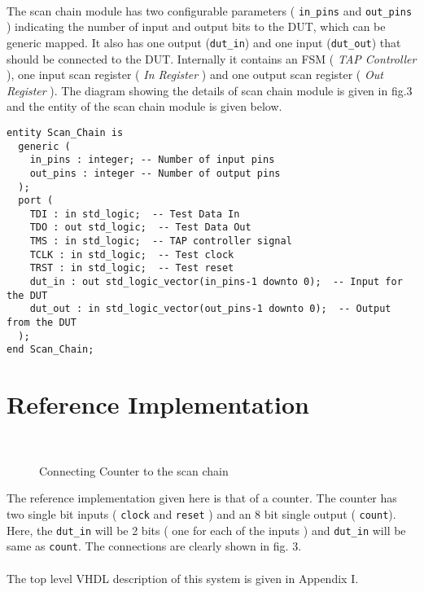 \documentclass[a4paper,11pt]{article}
\begin{document}
\paragraph*{}

The scan chain module has two configurable parameters ( \texttt{in\_pins} and \texttt{out\_pins} ) indicating the number of input and output bits to the DUT, which can be generic mapped. It also has one output (\texttt{dut\_in}) and one input (\texttt{dut\_out}) that should be connected to the DUT. Internally it contains an FSM ( \textit{TAP Controller} ), one input scan register ( \textit{In Register} ) and one output scan register ( \textit{Out Register} ). The diagram showing the details of scan chain module is given in fig.3 and the entity of the scan chain module is given below.

\begin{verbatim}
entity Scan_Chain is
  generic (
    in_pins : integer; -- Number of input pins
    out_pins : integer -- Number of output pins
  );
  port (
    TDI : in std_logic;  -- Test Data In
    TDO : out std_logic;  -- Test Data Out
    TMS : in std_logic;  -- TAP controller signal
    TCLK : in std_logic;  -- Test clock
    TRST : in std_logic;  -- Test reset
    dut_in : out std_logic_vector(in_pins-1 downto 0);  -- Input for the DUT
    dut_out : in std_logic_vector(out_pins-1 downto 0);  -- Output from the DUT
  );
end Scan_Chain;
\end{verbatim}

\section{Reference Implementation}

\begin{figure}[h!]
\centering
\\
\caption{Connecting Counter to the scan chain}
\end{figure}

The reference implementation given here is that of a counter. The counter has two single bit inputs ( \texttt{clock} and \texttt{reset} ) and an 8 bit single output ( \texttt{count}). Here, the \texttt{dut\_in} will be 2 bits ( one for each of the inputs ) and \texttt{dut\_in} will be same as \texttt{count}. The connections are clearly shown in fig. 3.
\paragraph*{}
The top level VHDL description of this system is given in Appendix I.
\end{document}
